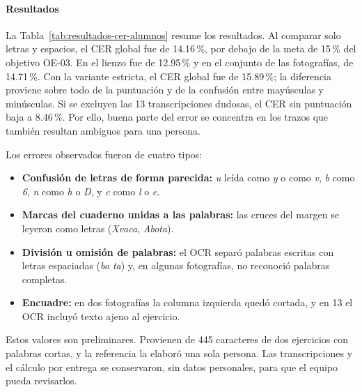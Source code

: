 \paragraph{Resultados}
La Tabla~\ref{tab:resultados-cer-alumnos} resume los resultados. Al comparar solo letras y espacios, el CER global fue de 14.16\,\%, por debajo de la meta de 15\,\% del objetivo OE-03. En el lienzo fue de 12.95\,\% y en el conjunto de las fotografías, de 14.71\,\%. Con la variante estricta, el CER global fue de 15.89\,\%; la diferencia proviene sobre todo de la puntuación y de la confusión entre mayúsculas y minúsculas. Si se excluyen las 13 transcripciones dudosas, el CER sin puntuación baja a 8.46\,\%. Por ello, buena parte del error se concentra en los trazos que también resultan ambiguos para una persona.

Los errores observados fueron de cuatro tipos:
\begin{itemize}
    \item \textbf{Confusión de letras de forma parecida:} \textit{u} leída como \textit{y} o como \textit{v}, \textit{b} como \textit{6}, \textit{n} como \textit{h} o \textit{D}, y \textit{c} como \textit{l} o \textit{e}.
    \item \textbf{Marcas del cuaderno unidas a las palabras:} las cruces del margen se leyeron como letras (\textit{Xvaca}, \textit{Abota}).
    \item \textbf{División u omisión de palabras:} el OCR separó palabras escritas con letras espaciadas (\textit{bo ta}) y, en algunas fotografías, no reconoció palabras completas.
    \item \textbf{Encuadre:} en dos fotografías la columna izquierda quedó cortada, y en 13 el OCR incluyó texto ajeno al ejercicio.
\end{itemize}

Estos valores son preliminares. Provienen de 445 caracteres de dos ejercicios con palabras cortas, y la referencia la elaboró una sola persona. Las transcripciones y el cálculo por entrega se conservaron, sin datos personales, para que el equipo pueda revisarlos.
